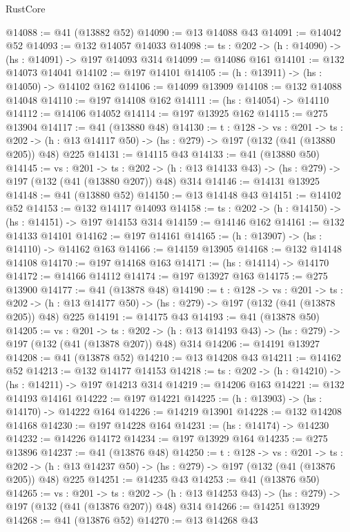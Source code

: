 \begin{lexlean}{RustCore}
\begin{coremodule}
@14088 := @41 (@13882 @52)
@14090 := @13 @14088 @43
@14091 := @14042 @52
@14093 := @132 @14057 @14033
@14098 := {ts : @202} -> (h : @14090) -> (hs : @14091) -> @197 @14093 @314
@14099 := @14086 @161
@14101 := @132 @14073 @14041
@14102 := @197 @14101
@14105 := (h : @13911) -> (hs : @14050) -> @14102 @162
@14106 := @14099 @13909
@14108 := @132 @14088 @14048
@14110 := @197 @14108 @162
@14111 := (hs : @14054) -> @14110
@14112 := @14106 @14052
@14114 := @197 @13925 @162
@14115 := @275 @13904
@14117 := @41 (@13880 @48)
@14130 := {t : @128} ->
  {vs : @201} ->
  {ts : @202} -> (h : @13 @14117 @50) -> (hs : @279) -> @197 (@132 (@41 (@13880 @205)) @48) @225
@14131 := @14115 @43
@14133 := @41 (@13880 @50)
@14145 := {vs : @201} ->
  {ts : @202} -> (h : @13 @14133 @43) -> (hs : @279) -> @197 (@132 (@41 (@13880 @207)) @48) @314
@14146 := @14131 @13925
@14148 := @41 (@13880 @52)
@14150 := @13 @14148 @43
@14151 := @14102 @52
@14153 := @132 @14117 @14093
@14158 := {ts : @202} -> (h : @14150) -> (hs : @14151) -> @197 @14153 @314
@14159 := @14146 @162
@14161 := @132 @14133 @14101
@14162 := @197 @14161
@14165 := (h : @13907) -> (hs : @14110) -> @14162 @163
@14166 := @14159 @13905
@14168 := @132 @14148 @14108
@14170 := @197 @14168 @163
@14171 := (hs : @14114) -> @14170
@14172 := @14166 @14112
@14174 := @197 @13927 @163
@14175 := @275 @13900
@14177 := @41 (@13878 @48)
@14190 := {t : @128} ->
  {vs : @201} ->
  {ts : @202} -> (h : @13 @14177 @50) -> (hs : @279) -> @197 (@132 (@41 (@13878 @205)) @48) @225
@14191 := @14175 @43
@14193 := @41 (@13878 @50)
@14205 := {vs : @201} ->
  {ts : @202} -> (h : @13 @14193 @43) -> (hs : @279) -> @197 (@132 (@41 (@13878 @207)) @48) @314
@14206 := @14191 @13927
@14208 := @41 (@13878 @52)
@14210 := @13 @14208 @43
@14211 := @14162 @52
@14213 := @132 @14177 @14153
@14218 := {ts : @202} -> (h : @14210) -> (hs : @14211) -> @197 @14213 @314
@14219 := @14206 @163
@14221 := @132 @14193 @14161
@14222 := @197 @14221
@14225 := (h : @13903) -> (hs : @14170) -> @14222 @164
@14226 := @14219 @13901
@14228 := @132 @14208 @14168
@14230 := @197 @14228 @164
@14231 := (hs : @14174) -> @14230
@14232 := @14226 @14172
@14234 := @197 @13929 @164
@14235 := @275 @13896
@14237 := @41 (@13876 @48)
@14250 := {t : @128} ->
  {vs : @201} ->
  {ts : @202} -> (h : @13 @14237 @50) -> (hs : @279) -> @197 (@132 (@41 (@13876 @205)) @48) @225
@14251 := @14235 @43
@14253 := @41 (@13876 @50)
@14265 := {vs : @201} ->
  {ts : @202} -> (h : @13 @14253 @43) -> (hs : @279) -> @197 (@132 (@41 (@13876 @207)) @48) @314
@14266 := @14251 @13929
@14268 := @41 (@13876 @52)
@14270 := @13 @14268 @43

\end{coremodule}
\end{lexlean}

